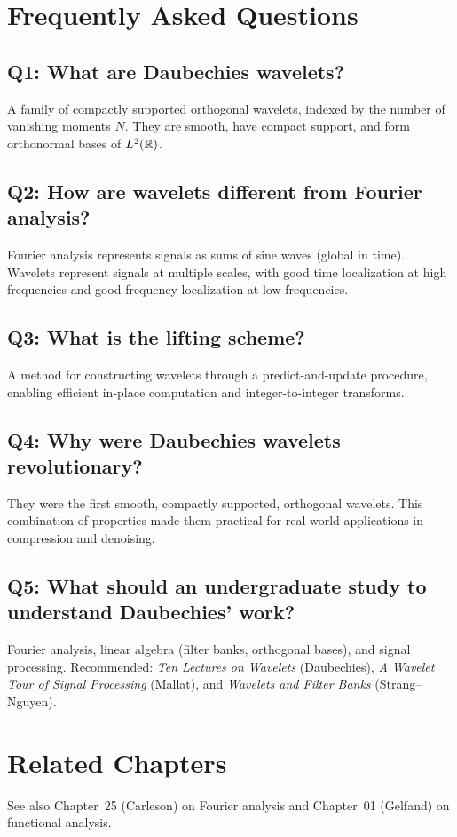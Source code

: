 \section{Frequently Asked Questions}

\subsection*{Q1: What are Daubechies wavelets?}
A family of compactly supported orthogonal wavelets, indexed by the number of vanishing moments $N$. They are smooth, have compact support, and form orthonormal bases of $L^2(\mathbb{R})$.

\subsection*{Q2: How are wavelets different from Fourier analysis?}
Fourier analysis represents signals as sums of sine waves (global in time). Wavelets represent signals at multiple scales, with good time localization at high frequencies and good frequency localization at low frequencies.

\subsection*{Q3: What is the lifting scheme?}
A method for constructing wavelets through a predict-and-update procedure, enabling efficient in-place computation and integer-to-integer transforms.

\subsection*{Q4: Why were Daubechies wavelets revolutionary?}
They were the first smooth, compactly supported, orthogonal wavelets. This combination of properties made them practical for real-world applications in compression and denoising.

\subsection*{Q5: What should an undergraduate study to understand Daubechies' work?}
Fourier analysis, linear algebra (filter banks, orthogonal bases), and signal processing. Recommended: \textit{Ten Lectures on Wavelets} (Daubechies), \textit{A Wavelet Tour of Signal Processing} (Mallat), and \textit{Wavelets and Filter Banks} (Strang--Nguyen).

\section{Related Chapters}
See also Chapter~25 (Carleson) on Fourier analysis and Chapter~01 (Gelfand) on functional analysis.


